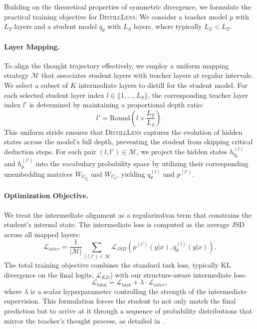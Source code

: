 \documentclass{article}
\theoremstyle{plain}
\theoremstyle{definition}
\theoremstyle{remark}
\begin{document}
Building on the theoretical properties of symmetric divergence, we formulate the practical training objective for \textsc{DistillLens}. We consider a teacher model $p$ with $L_T$ layers and a student model $q_\theta$ with $L_S$ layers, where typically $L_S < L_T$.

\paragraph{Layer Mapping.}
To align the thought trajectory effectively, we employ a uniform mapping strategy $\mathcal{M}$ that associates student layers with teacher layers at regular intervals.
We select a subset of $K$ intermediate layers to distill for the student model. 
For each selected student layer index $l \in \{1, \dots, L_S\}$, the corresponding teacher layer index $l'$ is determined by maintaining a proportional depth ratio:
\begin{equation}
    l' = \text{Round}\left( l \times \frac{L_T}{L_S} \right).
\end{equation}
This uniform stride ensures that \textsc{DistillLens} captures the evolution of hidden states across the model's full depth, preventing the student from skipping critical deduction steps.
For each pair $(l, l') \in \mathcal{M}$, we project the hidden states $h_{q_\theta}^{(l)}$ and $h_{p}^{(l')}$ into the vocabulary probability space by utilizing their corresponding unembedding matrices $W_{U_{q_\theta}}$ and $W_{U_p}$, yielding $q_\theta^{(l)}$ and $p^{(l')}$.

\paragraph{Optimization Objective.}
We treat the intermediate alignment as a regularization term that constrains the student's internal state. The intermediate loss is computed as the average JSD across all mapped layers:
\begin{equation}
    \mathcal{L}_{inter} = \frac{1}{|\mathcal{M}|} \sum_{(l, l') \in \mathcal{M}} \mathcal{L}_{JSD}\left(p^{(l')}(y|x), q_\theta^{(l)}(y|x)\right).
\end{equation}
The total training objective combines the standard task loss, typically KL divergence on the final logits, $\mathcal{L}_{KD}$) with our structure-aware intermediate loss:
\begin{equation}
    \mathcal{L}_{total} = \mathcal{L}_{task} + \lambda \cdot \mathcal{L}_{inter},
\end{equation}
where $\lambda$ is a scalar hyperparameter controlling the strength of the intermediate supervision.
This formulation forces the student to not only match the final prediction but to arrive at it through a sequence of probability distributions that mirror the teacher's thought process, as detailed in .
\end{document}
